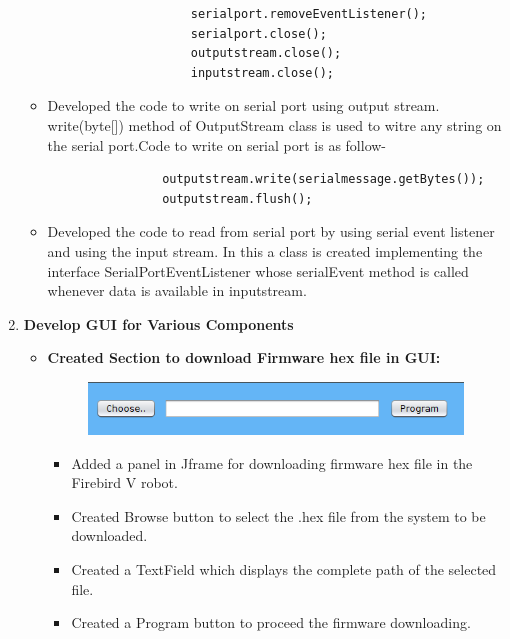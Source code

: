 \documentclass[a4paper,12pt,oneside]{book}
\begin{document}
\begin{enumerate}
\begin{itemize}
\begin{flushleft}
				\lstset{language=Java, showspaces=false,
					showstringspaces=false, tabsize=1, breaklines=true}
				\begin{lstlisting}
					serialport.removeEventListener(); 
					serialport.close(); 
					outputstream.close(); 
					inputstream.close();
				\end{lstlisting}
			\end{flushleft}
			\item Developed the code to write on serial port using output stream. write(byte[]) method of OutputStream class is used to witre any string on the serial port.Code to write on serial port is as follow- 
			\begin{flushleft}
				\lstset{language=Java, showspaces=false,
					showstringspaces=false, tabsize=1, breaklines=true}
				\begin{lstlisting}
				outputstream.write(serialmessage.getBytes()); 
				outputstream.flush();
				\end{lstlisting}
			\end{flushleft}
			\item Developed the code to read from serial port by using serial event listener and using the input stream. In this a class is created implementing the interface SerialPortEventListener whose serialEvent method is called whenever data is available in inputstream.  
		\end{itemize}
		\newpage
		\item \textbf{\large Develop GUI for Various Components}
		\begin{itemize}
		    	\item \textbf{Created Section to download Firmware hex file in GUI:}
			\begin{figure}[h]
				\begin{center}
					\includegraphics[scale=0.75]{browse.png}
				\end{center}
			\end{figure}
			\begin{itemize}
				\item Added a panel in Jframe for downloading firmware hex file in the Firebird V robot.
				\item Created Browse button to select the .hex file from the system to be downloaded.
				\item  Created a TextField which displays the complete path of the selected file.
				\item Created a Program button to proceed the firmware downloading.
			\end{itemize}
			

\end{itemize}
\end{enumerate}
\end{document}
